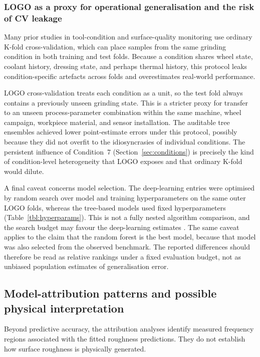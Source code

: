 \subsubsection{LOGO as a proxy for operational generalisation and the
risk of CV leakage}\label{logo-operational-generalisation}

Many prior studies in tool-condition and surface-quality monitoring use
ordinary K-fold cross-validation, which can place samples from the same
grinding condition in both training and test folds. Because a condition
shares wheel state, coolant history, dressing state, and perhaps thermal
history, this protocol leaks condition-specific artefacts across folds and
overestimates real-world performance.

LOGO cross-validation treats each condition as a unit, so the test fold
always contains a previously unseen grinding state. This is a stricter proxy
for transfer to an unseen process-parameter combination within the same machine, wheel campaign, workpiece material, and sensor installation. The auditable tree ensembles achieved lower point-estimate errors under this protocol, possibly
because they did not overfit to the idiosyncrasies of individual
conditions. The persistent influence of
Condition~7 (Section~\ref{sec:conditions}) is precisely the kind of
condition-level heterogeneity that LOGO exposes and that ordinary K-fold
would dilute.

A final caveat concerns model selection. The deep-learning entries were
optimised by random search over model and training hyperparameters on the
same outer LOGO folds, whereas the tree-based models used fixed
hyperparameters (Table~\ref{tbl:hyperparams}). This is not a fully nested
algorithm comparison, and the search budget may favour the deep-learning
estimates \cite{varma2006bias}. The same caveat applies to the claim that
the random forest is the best model, because that model was also selected
from the observed benchmark. The reported differences should therefore be
read as relative rankings under a fixed evaluation budget, not as unbiased
population estimates of generalisation error.

\subsection{Model-attribution patterns and possible physical
interpretation}\label{grinding-process-insights}

Beyond predictive accuracy, the attribution analyses identify measured
frequency regions associated with the fitted roughness predictions. They do
not establish how surface roughness is physically generated.

